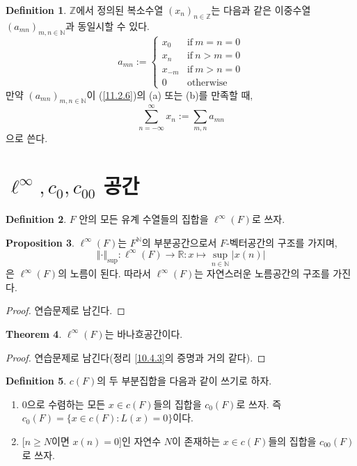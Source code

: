 \documentclass[11pt]{book}
\numberwithin{equation}{chapter}
\def\NN{\mathbb{N}}
\def\ZZ{\mathbb{Z}}
\def\RR{\mathbb{R}}
\newcommand{\abs}[1]{\left\vert#1\right\vert}
\newcommand{\norm}[1]{\left\Vert#1\right\Vert}
\def\textif{\text{if}}
\def\otw{\text{otherwise}}
\theoremstyle{definition}
\newtheorem{thm}{Theorem}[section]
\newtheorem{prop}[thm]{Proposition}
\newtheorem{defn}[thm]{Definition}
\newenvironment{enum}
	{\begin{enumerate}[label=(\alph*), leftmargin=2\parindent]}
	{\end{enumerate}}
\begin{document}
\begin{defn}
    \(\ZZ\)에서 정의된 복소수열 \((x_n)_{n \in \ZZ}\)는 다음과 같은 이중수열 \((a_{mn})_{m, n \in \NN}\)과 동일시할 수 있다.
    \[
        a_{mn} :=
        \begin{cases}
            x_0 &\textif \ m = n = 0\\
            x_n &\textif \ n > m = 0\\
            x_{-m} &\textif \ m > n = 0\\
            0 &\otw
        \end{cases}
    \]
    만약 \((a_{mn})_{m, n \in \NN}\)이 (\ref{11.2.6})의 (a) 또는 (b)를 만족할 때,
    \[
    \sum_{n = -\infty}^{\infty} x_n := \sum_{m,n} a_{mn}    
    \]
    으로 쓴다.
\end{defn}

\section{\(\ell^\infty, c_{0}, c_{00}\) 공간}

\begin{defn}
    \(F\) 안의 모든 유계 수열들의 집합을 \(\ell^\infty(F)\)로 쓰자.
\end{defn}

\begin{prop}
    \(\ell^\infty(F)\)는 \(F^\NN\)의 부분공간으로서 \(F\)-벡터공간의 구조를 가지며,
    \[
    \norm{\cdot}_{\sup} : \ell^\infty(F) \to \RR : x \mapsto \sup_{n \in \NN} \abs{x(n)}    
    \]
    은 \(\ell^\infty(F)\)의 노름이 된다. 따라서 \(\ell^\infty(F)\)는 자연스러운 노름공간의 구조를 가진다.
\end{prop}
\begin{proof}
    연습문제로 남긴다.
\end{proof}

\begin{thm}
    \(\ell^\infty(F)\)는 바나흐공간이다.
\end{thm}
\begin{proof}
    연습문제로 남긴다(정리 \ref{10.4.3}의 증명과 거의 같다).
\end{proof}

\begin{defn}
    \(c(F)\)의 두 부분집합을 다음과 같이 쓰기로 하자.
    \begin{enum}
        \item 0으로 수렴하는 모든 \(x \in c(F)\)들의 집합을 \(c_0(F)\)로 쓰자. 즉 \(c_0(F) = \{x \in c(F) : L(x) = 0\}\)이다.
        \item {[\(n \ge N\)이면 \(x(n) = 0\)]}인 자연수 \(N\)이 존재하는 \(x \in c(F)\)들의 집합을 \(c_{00}(F)\)로 쓰자.
    \end{enum}
\end{defn}
\end{document}
